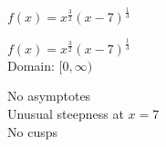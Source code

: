 {$f(x) = x^{\frac{3}{2}}(x - 7)^{\frac{1}{3}}$}
{$f(x) = x^{\frac{3}{2}}(x - 7)^{\frac{1}{3}}$\\
Domain: $[0, \infty)$\\
\begin{center}
\end{center}

No asymptotes\\
Unusual steepness at $x = 7$\\
No cusps\\

\begin{center}
\end{center}}




